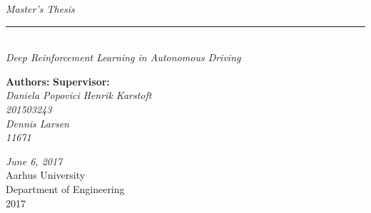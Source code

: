 \thispagestyle{empty}


\begin{center}
	\textsl{\LARGE Master's Thesis } \\ \vspace{0cm}
	\rule{15cm}{0.5mm}  \\ \vspace{0.5cm}
	\textsl{\HUGE Deep Reinforcement Learning in Autonomous Driving}
	
	
	\vfill
	\begin{flushleft}
		\textbf{Authors:} \hfill                 \textbf{Supervisor:}   \\
		\textit{Daniela Popovici} \hfill        \textit{Henrik Karstoft}        \\
		\textsl{201503243}\\
		
		\textit{Dennis Larsen}\\
		\textsl{11671}
	\end{flushleft}
	\vfill
	\textit{June 6, 2017}\\
	Aarhus University \\
	Department of Engineering \\
	2017
\end{center}


